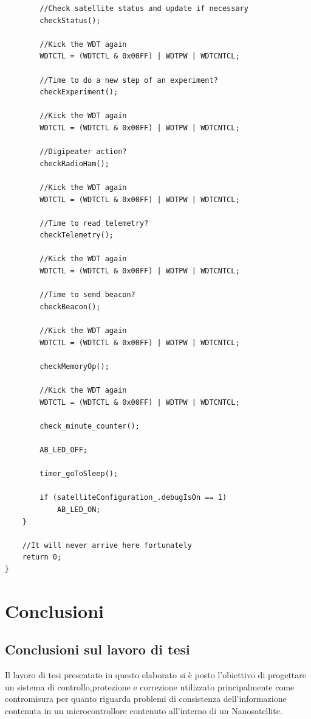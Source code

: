 \documentclass[LaM,binding=0.6cm,oneside]{../sapthesis}
\begin{document}
\begin{lstlisting}
        //Check satellite status and update if necessary
        checkStatus();

        //Kick the WDT again
        WDTCTL = (WDTCTL & 0x00FF) | WDTPW | WDTCNTCL;

        //Time to do a new step of an experiment?
        checkExperiment();

        //Kick the WDT again
        WDTCTL = (WDTCTL & 0x00FF) | WDTPW | WDTCNTCL;

        //Digipeater action?
        checkRadioHam();

        //Kick the WDT again
        WDTCTL = (WDTCTL & 0x00FF) | WDTPW | WDTCNTCL;

        //Time to read telemetry?
        checkTelemetry();

        //Kick the WDT again
        WDTCTL = (WDTCTL & 0x00FF) | WDTPW | WDTCNTCL;

        //Time to send beacon?
        checkBeacon();

        //Kick the WDT again
        WDTCTL = (WDTCTL & 0x00FF) | WDTPW | WDTCNTCL;

        checkMemoryOp();

        //Kick the WDT again
        WDTCTL = (WDTCTL & 0x00FF) | WDTPW | WDTCNTCL;

        check_minute_counter();

        AB_LED_OFF;

        timer_goToSleep();

        if (satelliteConfiguration_.debugIsOn == 1)
            AB_LED_ON;
    }

    //It will never arrive here fortunately
    return 0;
}
\end{lstlisting}



\chapter{Conclusioni}

\section{Conclusioni sul lavoro di tesi}

Il lavoro di tesi presentato in questo elaborato si è posto l'obiettivo di progettare un sistema di controllo,protezione e correzione
utilizzato principalmente come contromisura per quanto riguarda problemi di consistenza dell'informazione contenuta in un microcontrollore contenuto all'interno di un Nanosatellite.
\end{document}
